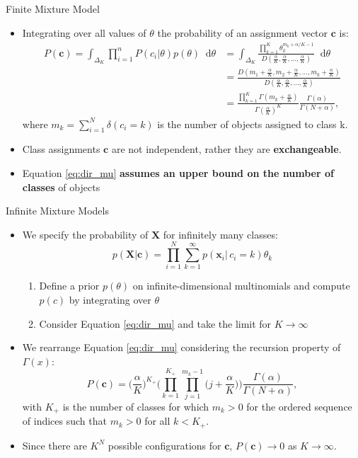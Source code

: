\documentclass[aspectratio=169,xcolor=dvipsnames]{beamer}
\newcommand*\diff{\mathop{}\!\mathrm{d}}
\newcommand{\vecx}{\textbf{x}}
\newcommand{\vecc}{\textbf{c}}
\newcommand{\matx}{\textbf{X}}
\newcommand{\aOverK}{\frac{\alpha}{K}}
\begin{document}
\begin{frame}{Finite Mixture Model}
\setlength{\leftmargini}{0.2cm}
\begin{itemize}
\item Integrating over all values of $\theta$ the probability of an assignment vector $\vecc$ is:
\begin{align}
    P(\vecc) = \int_{\Delta_{K}} \prod_{i=1}^{n} P(c_i| \theta) p(\theta) \diff \theta 
    &= \int_{\Delta_{K}} \frac{\prod_{k=1}^{K}\theta^{m_k + \alpha/K-1}_{k}}{D(\aOverK,\aOverK,\dots,\aOverK)} \diff \theta  \nonumber \\
    &= \frac{D(m_1+\aOverK, m_2+\aOverK,\dots, m_k +\aOverK)}{D(\aOverK,\aOverK,\dots,\aOverK)}  \nonumber\\
    &= \frac{\prod_{k=1}^{K} \Gamma(m_k + \aOverK )}{\Gamma(\aOverK)^{K}} \frac{\Gamma(\alpha)}{\Gamma(N+\alpha)},  \label{eq:dir_mu}
\end{align} 
where $m_k=\sum_{i=1}^{N}\delta(c_i=k)$ is the number of objects assigned to class k.
\item Class assignments $\vecc$ are not independent, rather they are \textbf{exchangeable}.
\item Equation \ref{eq:dir_mu} \textbf{assumes an upper bound on the number of classes} of objects
\end{itemize}
\end{frame}
\begin{frame}{Infinite Mixture Models}
\setlength{\leftmargini}{0.2cm}
\begin{itemize} 
\item We specify the probability of $\matx$ for infinitely many classes:
\begin{equation*}
      p(\matx|\vecc) = \prod_{i=1}^{N} \sum_{k=1}^{\infty} p(\vecx_i| \, c_i=k)\theta_k
\end{equation*}
\begin{enumerate}
    \item Define a prior $p(\theta)$ on infinite-dimensional multinomials and compute $p(c)$ by integrating over $\theta$
    \item Consider Equation \ref{eq:dir_mu} and take the limit for $K\rightarrow\infty$
\end{enumerate}
\item We rearrange Equation \ref{eq:dir_mu} considering the recursion property of $\Gamma(x)$:
\begin{equation}
    P(\vecc) = \Big(\aOverK\Big)^{K_+} \bigg( \prod_{k=1}^{K_{+}} \prod_{j=1}^{m_k-1}\Big(j+\aOverK\Big) \bigg) \frac{\Gamma(\alpha)}{\Gamma(N+\alpha)},  \label{eq:pr_c_lim}
\end{equation}
with $K_+$ is the number of classes for which $m_k > 0$ for the ordered sequence
of indices such that $m_k > 0$ for all $k <K_+$.
\item Since there are $K^N$ possible configurations for $\vecc$, $P(\vecc) \rightarrow 0$ as $K \rightarrow \infty$.
\end{itemize}
\end{frame}
\end{document}
